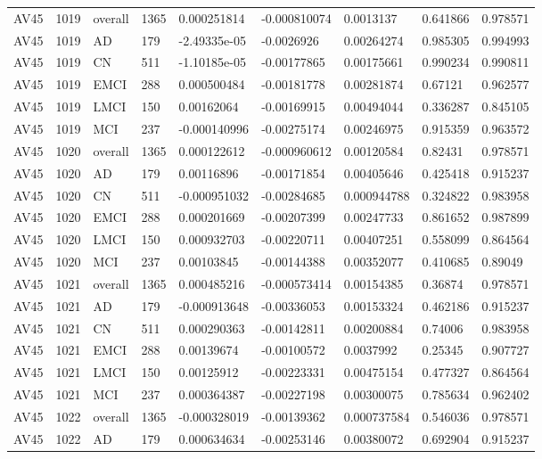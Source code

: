\begin{landscape}
\begin{longtable}{lllllllll}
AV45 & 1019 & overall & 1365 & 0.000251814 & -0.000810074 & 0.0013137 & 0.641866 & 0.978571 \\
AV45 & 1019 & AD & 179 & -2.49335e-05 & -0.0026926 & 0.00264274 & 0.985305 & 0.994993 \\
AV45 & 1019 & CN & 511 & -1.10185e-05 & -0.00177865 & 0.00175661 & 0.990234 & 0.990811 \\
AV45 & 1019 & EMCI & 288 & 0.000500484 & -0.00181778 & 0.00281874 & 0.67121 & 0.962577 \\
AV45 & 1019 & LMCI & 150 & 0.00162064 & -0.00169915 & 0.00494044 & 0.336287 & 0.845105 \\
AV45 & 1019 & MCI & 237 & -0.000140996 & -0.00275174 & 0.00246975 & 0.915359 & 0.963572 \\
AV45 & 1020 & overall & 1365 & 0.000122612 & -0.000960612 & 0.00120584 & 0.82431 & 0.978571 \\
AV45 & 1020 & AD & 179 & 0.00116896 & -0.00171854 & 0.00405646 & 0.425418 & 0.915237 \\
AV45 & 1020 & CN & 511 & -0.000951032 & -0.00284685 & 0.000944788 & 0.324822 & 0.983958 \\
AV45 & 1020 & EMCI & 288 & 0.000201669 & -0.00207399 & 0.00247733 & 0.861652 & 0.987899 \\
AV45 & 1020 & LMCI & 150 & 0.000932703 & -0.00220711 & 0.00407251 & 0.558099 & 0.864564 \\
AV45 & 1020 & MCI & 237 & 0.00103845 & -0.00144388 & 0.00352077 & 0.410685 & 0.89049 \\
AV45 & 1021 & overall & 1365 & 0.000485216 & -0.000573414 & 0.00154385 & 0.36874 & 0.978571 \\
AV45 & 1021 & AD & 179 & -0.000913648 & -0.00336053 & 0.00153324 & 0.462186 & 0.915237 \\
AV45 & 1021 & CN & 511 & 0.000290363 & -0.00142811 & 0.00200884 & 0.74006 & 0.983958 \\
AV45 & 1021 & EMCI & 288 & 0.00139674 & -0.00100572 & 0.0037992 & 0.25345 & 0.907727 \\
AV45 & 1021 & LMCI & 150 & 0.00125912 & -0.00223331 & 0.00475154 & 0.477327 & 0.864564 \\
AV45 & 1021 & MCI & 237 & 0.000364387 & -0.00227198 & 0.00300075 & 0.785634 & 0.962402 \\
AV45 & 1022 & overall & 1365 & -0.000328019 & -0.00139362 & 0.000737584 & 0.546036 & 0.978571 \\
AV45 & 1022 & AD & 179 & 0.000634634 & -0.00253146 & 0.00380072 & 0.692904 & 0.915237 \\

\end{longtable}
\end{landscape}
